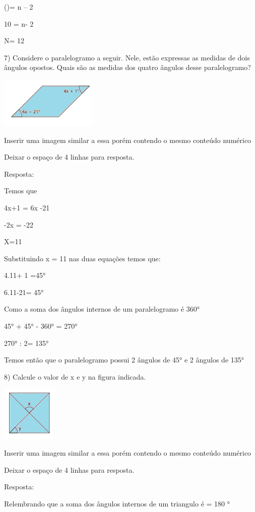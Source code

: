 ()= n -- 2

10 = n- 2

N= 12

7) Considere o paralelogramo a seguir. Nele, estão expressas as medidas
de dois ângulos opostos. Quais são as medidas dos quatro ângulos desse
paralelogramo?

\includegraphics[width=1.82292in,height=0.95833in]{./imgSAEB_8_MAT/media/image9.png}

Inserir uma imagem similar a essa porém contendo o mesmo conteúdo
numérico

Deixar o espaço de 4 linhas para resposta.

Resposta:

Temos que

4x+1 = 6x -21

-2x = -22

X=11

Substituindo x = 11 nas duas equações temos que:

4.11+ 1 =45°

6.11-21= 45°

Como a soma dos ângulos internos de um paralelogramo é 360°

45° + 45° - 360° = 270°

270° : 2= 135°

Temos então que o paralelogramo possui 2 ângulos de 45° e 2 ângulos de
135°

8) Calcule o valor de x e y na figura indicada.

\includegraphics[width=1.03125in,height=1.03125in]{./imgSAEB_8_MAT/media/image10.png}

Inserir uma imagem similar a essa porém contendo o mesmo conteúdo
numérico

Deixar o espaço de 4 linhas para resposta.

Resposta:

Relembrando que a soma dos ângulos internos de um triangulo é = 180 °

